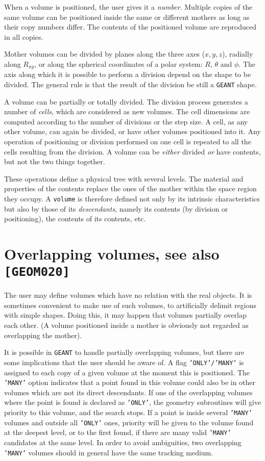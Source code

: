 When a volume is positioned, the user gives it a {\it number}. Multiple copies 
of the same volume can be positioned inside the same or different mothers
as long as their copy numbers differ.
The contents of the positioned volume are reproduced 
in all copies. 

Mother volumes can be divided by planes along the three axes ($ x, y, z$),
radially along $R_{xy}$, or along the spherical coordinates of a 
polar system: $R$, $\theta$ and $\phi$. The axis along which it is
possible to perform a division depend on the shape to be divided. The
general rule is that the result of the division be still a {\tt GEANT} shape.

A volume can be partially or totally divided.
The division process
generates a number of {\it cells}, which are considered as new volumes.
The cell dimensions are computed
according to the number of divisions or the step size. A cell, as any
other volume, can again be divided, or have other
volumes positioned into it. Any operation of positioning or division
performed on one cell is repeated to all the cells resulting
from the division. A volume can be {\it either} divided {\it or} have
contents, but not the two things together.

These operations define a physical tree with several
levels. The material and properties of the contents replace the
ones of the mother within the space region they occupy.
A {\tt volume} is therefore defined not only by its intrinsic characteristics
but also by those of its {\it descendants}, namely its contents (by
division or positioning), the contents of its contents, etc.

\section{ Overlapping volumes, see also {\tt [GEOM020]} }
The user may define volumes which have no relation with the real
objects. It is sometimes convenient to make use of such volumes,
to artificially delimit regions with simple shapes.
Doing this, it may happen that
volumes partially overlap each other. (A volume positioned inside a mother is
obviously not regarded as overlapping the mother).

It is possible in {\tt GEANT} to handle partially overlapping volumes, but
there are some implications that the user should be aware of.
A flag {\tt 'ONLY'/'MANY'} is assigned to each copy of a given volume at the 
moment this is positioned. The {\tt 'MANY'} option indicates that
a point found in this volume could also be in other volumes which are
not its direct descendants. If one of the
overlapping volumes where the point is found is declared as {\tt 'ONLY'}, the
geometry subroutines will give priority to this volume, 
and the search stops.
If a point is inside several {\tt 'MANY'} volumes and outside all {\tt 'ONLY'}
ones, priority will be given to the volume
found at the deepest level, or to the first found, if there are many
valid {\tt 'MANY'} candidates at the same level. In order to avoid ambiguities,
two overlapping {\tt 'MANY'} volumes should in general
have the same tracking medium.

